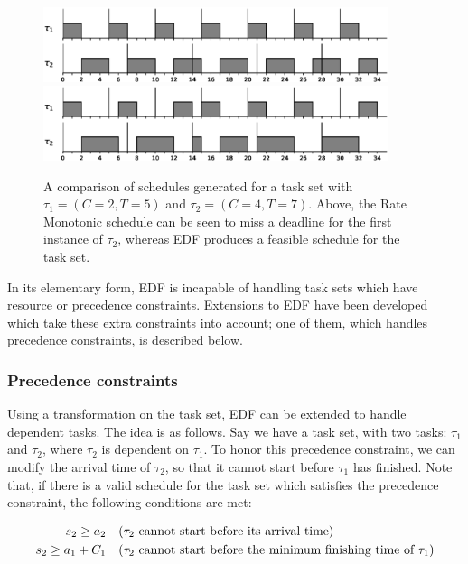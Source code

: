 \documentclass[twoside]{uva-inf-bachelor-thesis}
\newcommand{\task}[1]{\ensuremath{\tau_#1}}
\begin{document}
\begin{figure}[htpb]
    \centering
    \includegraphics[width=0.9\textwidth]{rmfail.eps}
    \includegraphics[width=0.9\textwidth]{edfsucc.eps}
    \caption{A comparison of schedules generated for a task set with $\tau_1 = (C = 2, T = 5)$ and $\tau_2 = (C = 4, T = 7)$. Above, the Rate Monotonic schedule can be seen to miss a deadline for the first instance of $\tau_2$, whereas EDF produces a feasible schedule for the task set.}
    \label{fig:edfrmfeasible}
\end{figure}

In its elementary form, EDF is incapable of handling task sets which have resource or precedence constraints. Extensions to EDF have been developed which take these extra constraints into account; one of them, which handles precedence constraints, is described below.

\subsubsection{Precedence constraints}
Using a transformation on the task set, EDF can be extended to handle dependent tasks\cite{Chetto1990}. The idea is as follows. Say we have a task set, with two tasks: \task{1} and \task{2}, where \task{2} is dependent on \task{1}. To honor this precedence constraint, we can modify the arrival time of \task{2}, so that it cannot start before \task{1} has finished. Note that, if there is a valid schedule for the task set which satisfies the precedence constraint, the following conditions are met:

\begin{align}
    s_2 \ge a_2 \quad &\text{(\task{2} cannot start before its arrival time)}\\
    s_2 \ge a_1 + C_1 \quad &\text{(\task{2} cannot start before the minimum finishing time of \task{1})}
\end{align}
\end{document}
